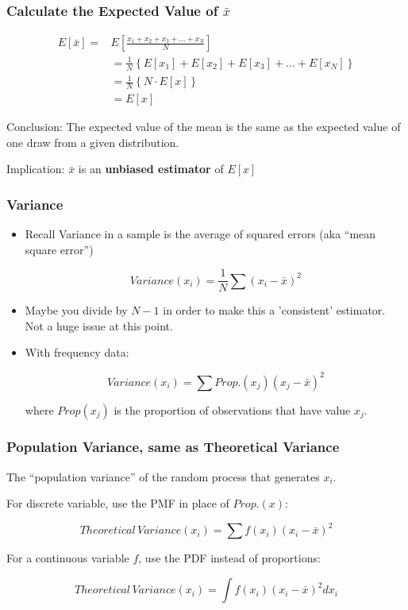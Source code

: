 \documentclass[10pt,english]{beamer}
\begin{document}
\begin{frame}
  \frametitle{Calculate the Expected Value of $\bar{x}$}
  \begin{eqnarray*}
    E[\bar{x}] = & E\left[\frac{x_1+x_2 +x_3+\ldots +x_N}{N}\right]\\
    & = \frac{1}{N} \left\{E[x_1]+E[x_2]+E[x_3]+\ldots + E[x_N] \right\}\\
    & = \frac{1}{N} \left\{N \cdot E[x] \right\} \\
    & = E[x]
  \end{eqnarray*}

   Conclusion: The expected value of the mean is the same as the
   expected value of one draw from a given distribution.
   
   Implication: $\bar{x}$ is an \textbf{unbiased estimator} of $E[x]$
\end{frame} 




\begin{frame}
  \frametitle{Variance}
\begin{itemize}
  \item  Recall Variance in a sample is the average of squared errors
    (aka ``mean square error'')

    \begin{equation}
Variance(x_{i})=\frac{1}{N}\sum(x_{i}-\bar{x})^{2}\label{eq:-6}\end{equation}

 \item Maybe you divide by $N-1$ in order to make this a 'consistent' estimator.
Not a huge issue at this point.
 
 \item With frequency data:

\begin{equation}
Variance(x_{i})=\sum Prop.(x_{j})(x_{j}-\bar{x})^{2}\label{eq:-7}\end{equation}

where $Prop(x_{j})$ is the proportion of observations that
have value $x_{j}$. 
\end{itemize}
\end{frame}

\begin{frame}
 \frametitle{Population Variance, same as Theoretical Variance}
 
 The {}``population variance'' of the random process that generates
 $x_{i}$. 

 For discrete variable, use the PMF in place of $Prop.(x)$:

\begin{equation}
Theoretical\, Variance(x_{i})=\sum f(x_{i})(x_{i}-\bar{x})^{2}\label{eq:-1}\end{equation}
 
 For a continuous variable $f$, use the PDF instead of proportions:

\begin{equation}
Theoretical\, Variance(x_{i})=\int f(x_{i})(x_{i}-\bar{x})^{2}dx_{i}\label{eq:}\end{equation}



\end{frame}
\end{document}
